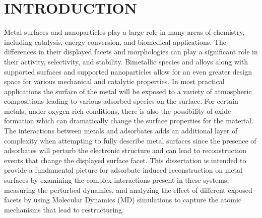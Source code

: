 %

\chapter{INTRODUCTION}
Metal surfaces and nanoparticles play a large role in many areas of chemistry,
including catalysis\citep{Clemens-Burda:2005qa, Sambur:2014mi}, energy
conversion\citep{Sneed:2014fj, Han:0qr}, and biomedical
applications.\citep{Padmos:0qf, Nicklin:0ss} The differences in their displayed
facets and morphologies can play a significant role in their
activity\citep{Chiu:2012ec, Stephens:2011bv}, selectivity\citep{Yi:0qq}, and
stability\citep{Zhang:2015ys, Zhang:2007uq}. Bimetallic species and alloys
along with supported surfaces and supported nanoparticles allow for an even
greater design space for various mechanical\citep{Cao:2010gf, Huang:2012ul} and
catalytic properties\citep{Han:0qr, Yu:2012by, Kim:2013mi, Jenness:2013oj}.  In
most practical applications the surface of the metal will be exposed to a
variety of atmospheric compositions leading to various adsorbed species on the
surface.  For certain metals, under oxygen-rich conditions, there is also the
possibility of oxide formation which can dramatically change the surface
properties for the material.\citep{Streitz:1994mw, Derouin:2015kx} The
interactions between metals and adsorbates adds an additional layer of
complexity when attempting to fully describe metal surfaces since the presence
of adsorbates will perturb the electronic structure and can lead to
reconstruction events that change the displayed surface
facet.\citep{Tao:2010aa, Tao:2008aa, Kim:2013mi} This dissertation is intended
to provide a fundamental picture for adsorbate induced reconstruction on metal
surfaces by examining the complex interactions present in these systems,
measuring the perturbed dynamics, and analyzing the effect of different exposed
facets by using Molecular Dynamics (MD) simulations to capture the atomic
mechanisms that lead to restructuring.


